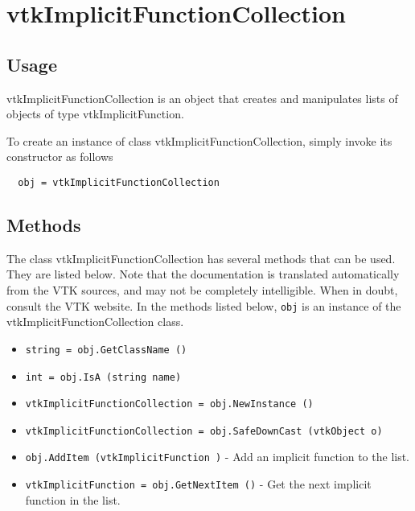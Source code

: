\section{vtkImplicitFunctionCollection}

\subsection{Usage}

 vtkImplicitFunctionCollection is an object that creates and manipulates
 lists of objects of type vtkImplicitFunction. 

To create an instance of class vtkImplicitFunctionCollection, simply
invoke its constructor as follows
\begin{verbatim}
  obj = vtkImplicitFunctionCollection
\end{verbatim}
\subsection{Methods}

The class vtkImplicitFunctionCollection has several methods that can be used.
  They are listed below.
Note that the documentation is translated automatically from the VTK sources,
and may not be completely intelligible.  When in doubt, consult the VTK website.
In the methods listed below, \verb|obj| is an instance of the vtkImplicitFunctionCollection class.
\begin{itemize}
\item  \verb|string = obj.GetClassName ()|

\item  \verb|int = obj.IsA (string name)|

\item  \verb|vtkImplicitFunctionCollection = obj.NewInstance ()|

\item  \verb|vtkImplicitFunctionCollection = obj.SafeDownCast (vtkObject o)|

\item  \verb|obj.AddItem (vtkImplicitFunction )| -  Add an implicit function to the list.

\item  \verb|vtkImplicitFunction = obj.GetNextItem ()| -  Get the next implicit function in the list.

\end{itemize}
